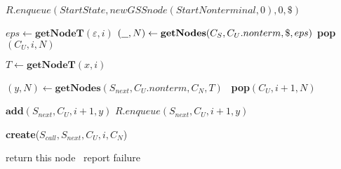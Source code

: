 \begin{algorithmic}
    \State $R.enqueue(StartState, new GSSnode(StartNonterminal,0), 0, \$)$
    
    \State $eps \gets \textbf{getNodeT}(\varepsilon, i)$  
    \State $(\underline{\hspace{0.25cm}}, N) \gets \textbf{getNodes}(C_{S},C_{U}.nonterm, \$, eps)$
    \State \textbf{pop}$(C_{U},i,N)$ 
    \EndIf
    
            \State $T \gets \textbf{getNodeT}(x, i)$
            
            \State $(y, N) \gets \textbf{getNodes}(S_{next},C_{U}.nonterm, C_{N}, T)$
                \ \textbf{pop}$(C_{U},i+1,N)$ 
            \EndIf
            
            \State $\textbf{add}(S_{next}, C_{U}, i + 1, y)$
            \Else
            \State $R.enqueue(S_{next}, C_{U}, i + 1, y)$
            \EndIf
        \EndCase
    
            \State \textbf{create}($S_{call}, S_{next}, C_{U}, i, C_{N}$)
        \EndCase
        \EndSwitch
        
    \EndFor
    \EndWhile
    \State return this node
    \Else
    \ report failure
    \EndIf
\EndFunction
\end{algorithmic}